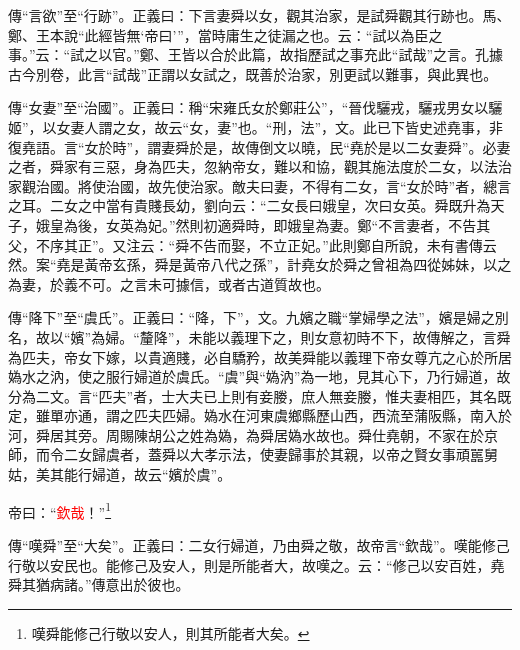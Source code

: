 {\noindent\zhuan{}\fzbyks 傳“言欲”至“行跡”。正義曰：下言妻舜以女，觀其治家，是試舜觀其行跡也。馬、鄭、王本說“此經皆無‘帝曰’”，當時庸生之徒漏之也。云：“試以為臣之事。”云：“試之以官。”鄭、王皆以合於此篇，故指歷試之事充此“試哉”之言。孔據古今別卷，此言“試哉”正謂以女試之，既善於治家，別更試以難事，與此異也。 \par}

{\noindent\zhuan{}\fzbyks 傳“女妻”至“治國”。正義曰：稱“宋雍氏女於鄭莊公”，“晉伐驪戎，驪戎男女以驪姬”，以女妻人謂之女，故云“女，妻”也。“刑，法”，文。此已下皆史述堯事，非復堯語。言“女於時”，謂妻舜於是，故傳倒文以曉，民“堯於是以二女妻舜”。必妻之者，舜家有三惡，身為匹夫，忽納帝女，難以和協，觀其施法度於二女，以法治家觀治國。將使治國，故先使治家。敵夫曰妻，不得有二女，言“女於時”者，總言之耳。二女之中當有貴賤長幼，劉向云：“二女長曰娥皇，次曰女英。舜既升為天子，娥皇為後，女英為妃。”然則初適舜時，即娥皇為妻。鄭“不言妻者，不告其父，不序其正”。又注云：“舜不告而娶，不立正妃。”此則鄭自所說，未有書傳云然。案“堯是黃帝玄孫，舜是黃帝八代之孫”，計堯女於舜之曾祖為四從姊妹，以之為妻，於義不可。之言未可據信，或者古道質故也。 \par}

{\noindent\zhuan{}\fzbyks 傳“降下”至“虞氏”。正義曰：“降，下”，文。九嬪之職“掌婦學之法”，嬪是婦之別名，故以“嬪”為婦。“釐降”，未能以義理下之，則女意初時不下，故傳解之，言舜為匹夫，帝女下嫁，以貴適賤，必自驕矜，故美舜能以義理下帝女尊亢之心於所居媯水之汭，使之服行婦道於虞氏。“虞”與“媯汭”為一地，見其心下，乃行婦道，故分為二文。言“匹夫”者，士大夫已上則有妾媵，庶人無妾媵，惟夫妻相匹，其名既定，雖單亦通，謂之匹夫匹婦。媯水在河東虞鄉縣歷山西，西流至蒲阪縣，南入於河，舜居其旁。周賜陳胡公之姓為媯，為舜居媯水故也。舜仕堯朝，不家在於京師，而令二女歸虞者，蓋舜以大孝示法，使妻歸事於其親，以帝之賢女事頑嚚舅姑，美其能行婦道，故云“嬪於虞”。 \par}

帝曰：“\textcolor{red}{欽哉}！”\footnote{嘆舜能修己行敬以安人，則其所能者大矣。}

{\noindent\zhuan{}\fzbyks 傳“嘆舜”至“大矣”。正義曰：二女行婦道，乃由舜之敬，故帝言“欽哉”。嘆能修己行敬以安民也。能修己及安人，則是所能者大，故嘆之。云：“修己以安百姓，堯舜其猶病諸。”傳意出於彼也。 \par}

